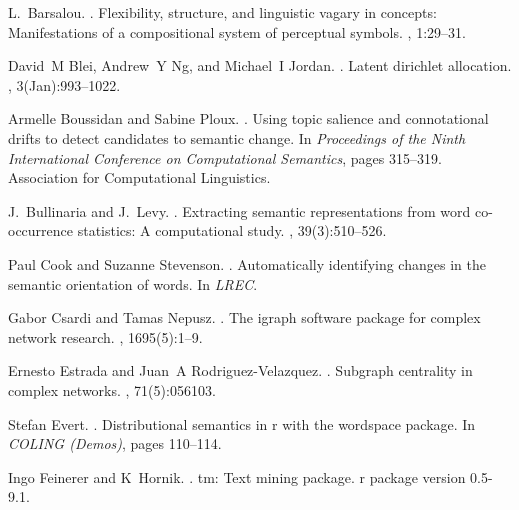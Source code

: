\documentclass[11pt]{article}
\begin{document}
\begin{thebibliography}{}

L.~Barsalou.
.
\newblock Flexibility, structure, and linguistic vagary in concepts:
  Manifestations of a compositional system of perceptual symbols.
, 1:29--31.

David~M Blei, Andrew~Y Ng, and Michael~I Jordan.
.
\newblock Latent dirichlet allocation.
, 3(Jan):993--1022.

Armelle Boussidan and Sabine Ploux.
.
\newblock Using topic salience and connotational drifts to detect candidates to
  semantic change.
\newblock In {\em Proceedings of the Ninth International Conference on
  Computational Semantics}, pages 315--319. Association for Computational
  Linguistics.

J.~Bullinaria and J.~Levy.
.
\newblock Extracting semantic representations from word co-occurrence
  statistics: A computational study.
, 39(3):510--526.

Paul Cook and Suzanne Stevenson.
.
\newblock Automatically identifying changes in the semantic orientation of
  words.
\newblock In {\em LREC}.

Gabor Csardi and Tamas Nepusz.
.
\newblock The igraph software package for complex network research.
, 1695(5):1--9.

Ernesto Estrada and Juan~A Rodriguez-Velazquez.
.
\newblock Subgraph centrality in complex networks.
, 71(5):056103.

Stefan Evert.
.
\newblock Distributional semantics in r with the wordspace package.
\newblock In {\em COLING (Demos)}, pages 110--114.

Ingo Feinerer and K~Hornik.
.
\newblock tm: Text mining package. r package version 0.5-9.1.


\end{thebibliography}
\end{document}
